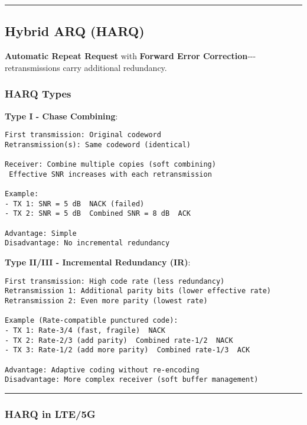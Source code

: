 \begin{center}\rule{0.5\linewidth}{0.5pt}\end{center}

\subsection{Hybrid ARQ (HARQ)}\label{hybrid-arq-harq}

\textbf{Automatic Repeat Request} with \textbf{Forward Error
Correction}-\/-\/-retransmissions carry additional redundancy.

\subsubsection{HARQ Types}\label{harq-types}

\textbf{Type I - Chase Combining}:

\begin{verbatim}
First transmission: Original codeword
Retransmission(s): Same codeword (identical)

Receiver: Combine multiple copies (soft combining)
 Effective SNR increases with each retransmission

Example:
- TX 1: SNR = 5 dB  NACK (failed)
- TX 2: SNR = 5 dB  Combined SNR = 8 dB  ACK 

Advantage: Simple
Disadvantage: No incremental redundancy
\end{verbatim}

\textbf{Type II/III - Incremental Redundancy (IR)}:

\begin{verbatim}
First transmission: High code rate (less redundancy)
Retransmission 1: Additional parity bits (lower effective rate)
Retransmission 2: Even more parity (lowest rate)

Example (Rate-compatible punctured code):
- TX 1: Rate-3/4 (fast, fragile)  NACK
- TX 2: Rate-2/3 (add parity)  Combined rate-1/2  NACK
- TX 3: Rate-1/2 (add more parity)  Combined rate-1/3  ACK 

Advantage: Adaptive coding without re-encoding
Disadvantage: More complex receiver (soft buffer management)
\end{verbatim}

\begin{center}\rule{0.5\linewidth}{0.5pt}\end{center}

\subsubsection{HARQ in LTE/5G}\label{harq-in-lte5g}


